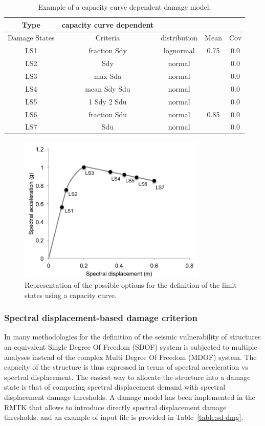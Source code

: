 \begin {table}[htb]
\caption{Example of a capacity curve dependent damage model.}
\label{table:cc-dmg}
\begin{center}
  \begin{tabular}{ | c | c | c | c | c |}
  \hline
    Type & capacity curve dependent &  &  & \\ \hline
    Damage States & Criteria & distribution & Mean & Cov \\ \hline
    LS1 & fraction Sdy & lognormal & 0.75 & 0.0 \\ \hline
    LS2 & Sdy & normal &  & 0.0 \\ \hline
    LS3 & max Sda & normal &  & 0.0 \\ \hline
    LS4 & mean Sdy Sdu & normal &  & 0.0 \\ \hline
    LS5 & 1 Sdy 2 Sdu & normal &  & 0.0 \\ \hline
    LS6 & fraction Sdu & normal & 0.85 & 0.0 \\ \hline
    LS7 & Sdu & normal &  & 0.0 \\ \hline
  \end{tabular}
\end{center}
\end{table}

\begin{figure}[htb]
  \centering
      \includegraphics[width=9cm]{figures/cc_damage_model.png}
  \caption{Representation of the possible options for the definition of the limit states using a capacity curve.}
  \label{fig:cc-dmg}
\end{figure}

\subsubsection{Spectral displacement-based damage criterion}
\label{subsubsec:sd-dmg}
In many methodologies for the definition of the seismic vulnerability of structures an equivalent Single Degree Of Freedom (SDOF) system is subjected to multiple analyses instead of the complex Multi Degree Of Freedom (MDOF) system. The capacity of the structure is thus expressed in terms of spectral acceleration vs spectral displacement. The easiest way to allocate the structure into a damage state is that of comparing spectral displacement demand with spectral displacement damage thresholds. A damage model has been implemented in the RMTK that allows to introduce directly spectral displacement damage thresholds, and an example of input file is provided in Table~\ref{table:sd-dmg}.

